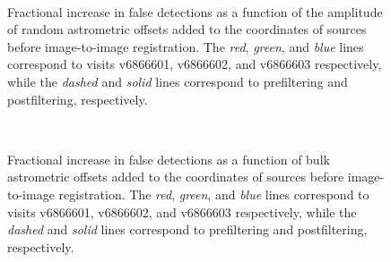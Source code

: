 \documentclass[prd, nofootinbib, floatfix, 11pt,tightenlines,times]{article}
\begin{document}
\begin{figure}
 \\
\caption{Fractional increase in false detections as a function of the
  amplitude of random astrometric offsets added to the coordinates of
  sources before image-to-image registration.  The {\it red}, {\it
    green}, and {\it blue} lines correspond to visits v6866601,
  v6866602, and v6866603 respectively, while the {\it dashed} and {\it
    solid} lines correspond to prefiltering and postfiltering,
  respectively.}
\label{wcsrms}
\end{figure}

\begin{figure}
 \\
\caption{Fractional increase in false detections as a function of bulk
  astrometric offsets added to the coordinates of sources before
  image-to-image registration.  The {\it red}, {\it green}, and {\it
    blue} lines correspond to visits v6866601, v6866602, and v6866603
  respectively, while the {\it dashed} and {\it solid} lines
  correspond to prefiltering and postfiltering, respectively.}
\label{wcsshift}
\end{figure}
\end{document}
